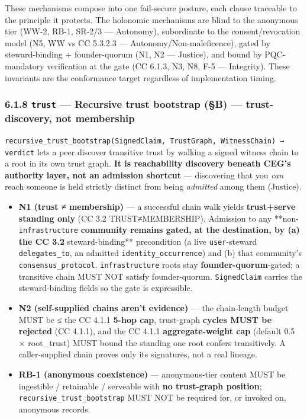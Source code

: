 \documentclass[11pt]{article}
\begin{document}
These mechanisms compose into one fail-secure posture, each clause traceable to the principle it protects. The holonomic mechanisms are blind to the anonymous tier (WW-2, RB-1, SR-2/3 — Autonomy), subordinate to the consent/revocation model (N5, WW vs CC 5.3.2.3 — Autonomy/Non-maleficence), gated by steward-binding + founder-quorum (N1, N2 — Justice), and bound by PQC-mandatory verification at the gate (CC 6.1.3, N3, N8, F-5 — Integrity). These invariants are the conformance target regardless of implementation timing.


\subsubsection*{6.1.8 \texttt{trust} — Recursive trust bootstrap (§B) — trust-discovery, not membership}


\texttt{recursive\_trust\_bootstrap(SignedClaim, TrustGraph, WitnessChain) → verdict} lets a peer discover transitive trust by walking a signed witness chain to a root in its own trust graph. \textbf{It is reachability discovery beneath CEG's authority layer, not an admission shortcut} — discovering that you \textit{can} reach someone is held strictly distinct from being \textit{admitted} among them (Justice).


\begin{itemize}\setlength\itemsep{0pt}
\item \textbf{N1 (trust ≠ membership)} — a successful chain walk yields \textbf{trust+serve standing only} (CC 3.2 TRUST≠MEMBERSHIP). Admission to any **non-\texttt{infrastructure}\textbf{ community remains gated, at the destination, by (a) the CC 3.2 }steward-binding** precondition (a live \texttt{user}-steward \texttt{delegates\_to}, an admitted \texttt{identity\_occurrence}) and (b) that community's \texttt{consensus\_protocol}. \texttt{infrastructure} roots stay \textbf{founder-quorum}-gated; a transitive chain MUST NOT satisfy founder-quorum. \texttt{SignedClaim} carries the steward-binding fields so the gate is expressible.
\item \textbf{N2 (self-supplied chains aren't evidence)} — the chain-length budget MUST be ≤ the CC 4.1.1 \textbf{5-hop cap}, trust-graph \textbf{cycles MUST be rejected} (CC 4.1.1), and the CC 4.1.1 \textbf{aggregate-weight cap} (default 0.5 × root\_trust) MUST bound the standing one root confers transitively. A caller-supplied chain proves only its signatures, not a real lineage.
\item \textbf{RB-1 (anonymous coexistence)} — anonymous-tier content MUST be ingestible / retainable / serveable with \textbf{no trust-graph position}; \texttt{recursive\_trust\_bootstrap} MUST NOT be required for, or invoked on, anonymous records.
\end{itemize}
\end{document}
